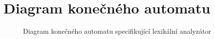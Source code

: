 \documentclass[11pt]{article}
\begin{document}
\section{Diagram konečného automatu}
\begin{figure}[H]
    \centering
    \vspace{0.1cm}
    \caption{Diagram konečného automatu specifikující lexikální analyzátor}
    \label{figure:fsm_img}
\end{figure}
\end{document}

